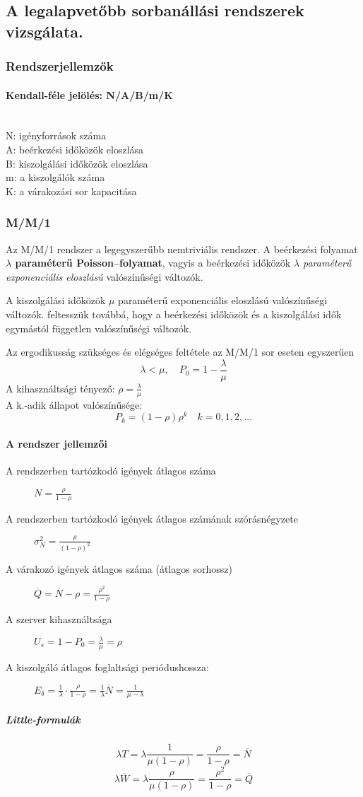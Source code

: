 \subsection{A legalapvetőbb sorbanállási rendszerek vizsgálata.}
\subsubsection{Rendszerjellemzők}

\paragraph{Kendall-féle jelölés: N/A/B/m/K}~\\
N: igényforrások száma\\
A: beérkezési időközök eloszlása\\
B: kiszolgálási időközök eloszlása\\
m: a kiszolgálók száma\\
K: a várakozási sor kapacitása

\subsubsection{M/M/1}
Az M/M/1 rendszer a legegyszerűbb nemtriviális rendszer. A beérkezési folyamat \textbf{$\lambda$ paraméterű Poisson--folyamat}, vagyis a beérkezési időközök \emph{$\lambda$ paraméterű exponenciális eloszlású} valószínűségi változók.

A kiszolgálási időközök $\mu$ paraméterű exponenciális eloszlású valószínűségi változók. feltesszük továbbá, hogy a beérkezési időközök és a kiszolgálási idők egymástól független valószínűségi változók.

Az ergodikusság szükséges és elégséges feltétele az M/M/1 sor eseten egyszerűen
$$\lambda<\mu,\quad P_0 = 1-\frac{\lambda}{\mu}$$
A kihasználtsági tényező: $\rho=\frac{\lambda}{\mu}$\\
A k.-adik állapot valószínűsége:
$$P_k=(1-\rho)\rho^k \quad k=0,1,2,\dots$$
\paragraph{A rendszer jellemzői}
\begin{description}
	\item[A rendszerben tartózkodó igények átlagos száma] $N=\frac{\rho}{1-\rho}$
	\item[A rendszerben tartózkodó igények átlagos számának szórásnégyzete] $\sigma_N^2=\frac{\rho}{(1-\rho)^2}$
	\item[A várakozó igények átlagos száma (átlagos sorhossz)] $\overline{Q}=\overline{N}-\rho=\frac{\rho^2}{1-\rho}$
	\item[A szerver kihasználtsága] $U_s=1-P_0=\frac{\lambda}{\mu}=\rho$
	\item[A kiszolgáló átlagos foglaltsági periódushossza:] $E_\delta=\frac{1}{\lambda}\cdot\frac{\rho}{1-\rho}=\frac{1}{\lambda}\overline{N}=\frac{1}{\mu-\lambda}$
\end{description}
\subparagraph{Little-formulák}
$$\lambda T=\lambda\frac{1}{\mu(1-\rho)}=\frac{\rho}{1-\rho}=\overline{N}$$
$$\lambda \overline{W}=\lambda\frac{\rho}{\mu(1-\rho)}=\frac{\rho^2}{1-\rho}=\overline{Q}$$

